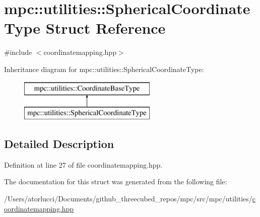 \hypertarget{structmpc_1_1utilities_1_1_spherical_coordinate_type}{}\section{mpc\+:\+:utilities\+:\+:Spherical\+Coordinate\+Type Struct Reference}
\label{structmpc_1_1utilities_1_1_spherical_coordinate_type}


{\ttfamily \#include $<$coordinatemapping.\+hpp$>$}

Inheritance diagram for mpc\+:\+:utilities\+:\+:Spherical\+Coordinate\+Type\+:\begin{figure}[H]
\begin{center}
\leavevmode
\includegraphics[height=2.000000cm]{structmpc_1_1utilities_1_1_spherical_coordinate_type}
\end{center}
\end{figure}


\subsection{Detailed Description}


Definition at line 27 of file coordinatemapping.\+hpp.



The documentation for this struct was generated from the following file\+:\begin{DoxyCompactItemize}
\item 
/\+Users/atorlucci/\+Documents/github\+\_\+threecubed\+\_\+repos/mpc/src/mpc/utilities/\mbox{\hyperlink{coordinatemapping_8hpp}{coordinatemapping.\+hpp}}\end{DoxyCompactItemize}
